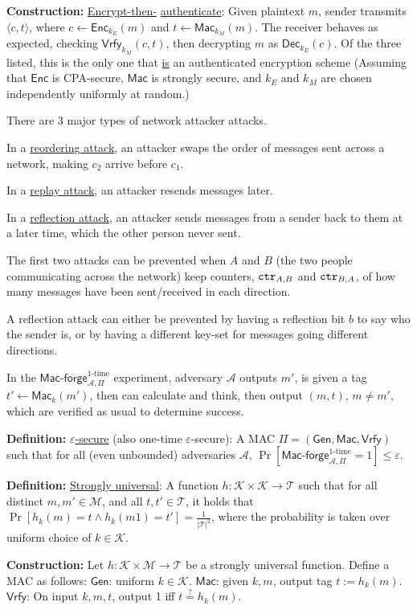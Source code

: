 \documentclass[10pt]{article}
\newcommand{\AAA}{\mathcal{A}}
\newcommand{\KKK}{\mathcal{K}}
\newcommand{\MMM}{\mathcal{M}}
\newcommand{\TTT}{\mathcal{T}}
\newcommand{\defn}[1]{{\bf Definition:} \underline{#1}}
\newcommand{\con}[1]{{\bf Construction:} \underline{#1}}
\newcommand{\Enc}{\mathsf{Enc}}
\newcommand{\Dec}{\mathsf{Dec}}
\newcommand{\Mac}{\mathsf{Mac}}
\newcommand{\Macf}{\mathsf{Mac\text{-}forge}}
\newcommand{\Vrfy}{\mathsf{Vrfy}}
\newcommand{\Gen}{\mathsf{Gen}}
\newcommand{\ang}[1]{\langle#1\rangle}
\newcommand{\GenMacVrfy}{(\Gen,\Mac,\Vrfy)}
\newcommand{\ctr}{{\tt ctr}}
\newcommand{\from}{\leftarrow}
\begin{document}
\begin{multicols}{5}
\con{Encrypt-then-} \underline{authenticate}: Given plaintext $m$, sender transmits $\ang{c,t}$, where $c\from\Enc_{k_E}(m)$ and $t\from\Mac_{k_M}(m)$. The receiver behaves as expected, checking $\Vrfy_{k_M}(c,t)$, then decrypting $m$ as $\Dec_{k_E}(c)$. Of the three listed, this is the only one that \underline{is} an authenticated encryption scheme (Assuming that $\Enc$ is CPA-secure, $\Mac$ is strongly secure, and $k_E$ and $k_M$ are chosen independently uniformly at random.)

There are 3 major types of network attacker attacks.

In a \underline{reordering attack}, an attacker swaps the order of messages sent across a network, making $c_2$ arrive before $c_1$.

In a \underline{replay attack}, an attacker resends messages later.

In a \underline{reflection attack}, an attacker sends messages from a sender back to them at a later time, which the other person never sent.

The first two attacks can be prevented when $A$ and $B$ (the two people communicating across the network) keep counters, $\ctr_{A,B}$ and $\ctr_{B,A}$, of how many messages have been sent/received in each direction.

A reflection attack can either be prevented by having a reflection bit $b$ to say who the sender is, or by having a different key-set for messages going different directions.

In the $\Macf_{\AAA,\Pi}^{\text{1-time}}$ experiment, adversary $\AAA$ outputs $m'$, is given a tag $t'\from\Mac_k(m')$, then can calculate and think, then output $(m,t)$, $m\neq m'$, which are verified as usual to determine success.

\defn{$\varepsilon$-secure} (also one-time $\varepsilon$-secure): A MAC $\Pi=\GenMacVrfy$ such that for all (even unbounded) adversaries $\AAA$, $\Pr[\Macf_{\AAA,\Pi}^{\text{1-time}}=1]\leq\varepsilon$.

\defn{Strongly universal}: A function $h:\KKK\times\KKK\to\TTT$ such that for all distinct $m,m'\in\MMM$, and all $t,t'\in\TTT$, it holds that $\Pr[h_k(m)=t\wedge h_k(m1)=t']=\frac{1}{|\TTT|^2}$, where the probability is taken over uniform choice of $k\in\KKK$.

\con{}Let $h:\KKK\times\MMM\to\TTT$ be a strongly universal function. Define a MAC as follows: $\Gen$: uniform $k\in\KKK$. $\Mac$: given $k,m$, output tag $t:=h_k(m)$. $\Vrfy$: On input $k,m,t$, output 1 iff $t\overset{?}{=}h_k(m)$.


\end{multicols}
\end{document}
